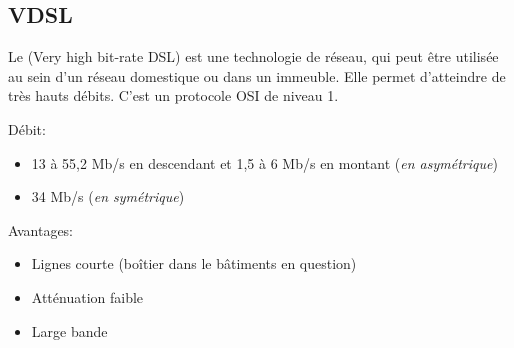 \subsection{VDSL}

Le  (Very high bit-rate DSL) est une technologie de réseau, qui peut être utilisée au sein d'un réseau domestique ou dans un immeuble. Elle permet d'atteindre de très hauts débits. C'est un protocole OSI de niveau 1.

Débit:
\begin{itemize}
\item 13 à 55,2 Mb/s en descendant et 1,5 à 6 Mb/s en montant (\textit{en asymétrique})
\item 34 Mb/s (\textit{en symétrique})
\end{itemize}

Avantages:
\begin{itemize}
\item Lignes courte (boîtier dans le bâtiments en question)
\item Atténuation faible
\item Large bande
\end{itemize}
